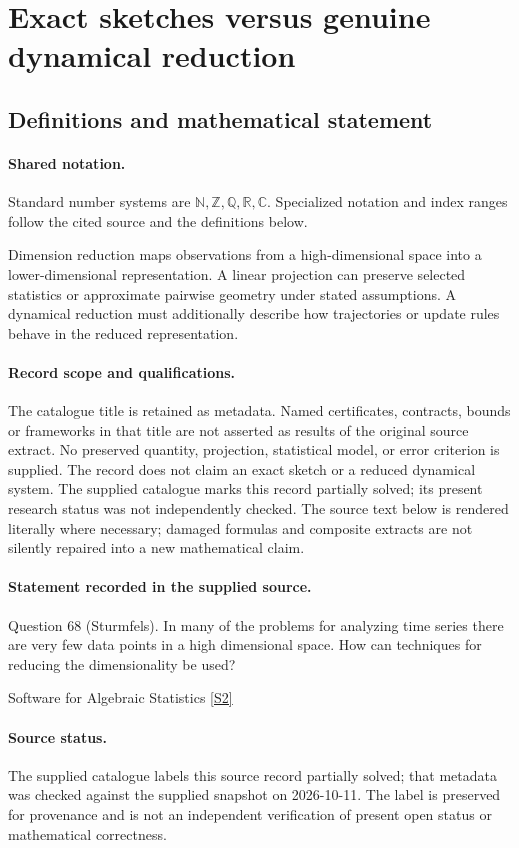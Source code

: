 \documentclass[11pt]{article}
\newcommand{\sref}[2]{\hyperlink{source:#1:#2}{[S#2]}}
\begin{document}
\section{Exact sketches versus genuine dynamical reduction}\label{statement}

\subsection{Definitions and mathematical statement}

\paragraph{Shared notation.}Standard number systems are $\mathbb N,\mathbb Z,\mathbb Q,\mathbb R,\mathbb C$. Specialized notation and index ranges follow the cited source and the definitions below.


Dimension reduction maps observations from a high-dimensional space into a lower-dimensional representation. A linear projection can preserve selected statistics or approximate pairwise geometry under stated assumptions. A dynamical reduction must additionally describe how trajectories or update rules behave in the reduced representation.
\paragraph{Record scope and qualifications.}
The catalogue title is retained as metadata. Named certificates, contracts, bounds or frameworks in that title are not asserted as results of the original source extract.
No preserved quantity, projection, statistical model, or error criterion is supplied. The record does not claim an exact sketch or a reduced dynamical system. The supplied catalogue marks this record partially solved; its present research status was not independently checked.
The source text below is rendered literally where necessary; damaged formulas and composite extracts are not silently repaired into a new mathematical claim.
\paragraph{Statement recorded in the supplied source.}
Question 68 (Sturmfels). In many of the problems for analyzing time series there are very few data points in a high dimensional space. How can techniques for reducing the dimensionality be used?

Software for Algebraic Statistics \sref{statement}{2}
\paragraph{Source status.}
The supplied catalogue labels this source record partially solved; that metadata was checked against the supplied snapshot on 2026-10-11. The label is preserved for provenance and is not an independent verification of present open status or mathematical correctness.
\end{document}
